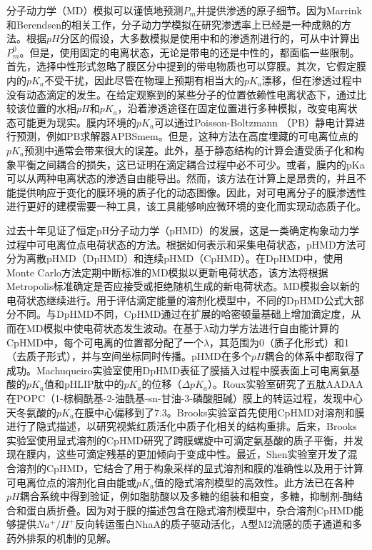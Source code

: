 \documentclass[journal=,manuscript=artical,email=false]{achemso}
\begin{document}
分子动力学（MD）模拟可以谨慎地预测$P_m$并提供渗透的原子细节。因为Marrink和Berendsen的相关工作，分子动力学模拟在研究渗透率上已经是一种成熟的方法。根据$pH$分区的假设，大多数模拟是使用中和的渗透剂进行的，可从中计算出$P^0_m$。但是，使用固定的电离状态，无论是带电的还是中性的，都面临一些限制。首先，选择中性形式忽略了膜区分中提到的带电物质也可以穿膜。其次，它假定膜内的$pK_a$不受干扰，因此尽管在物理上预期有相当大的$pK_a$漂移，但在渗透过程中没有动态滴定的发生。在给定观察到的某些分子的位置依赖性电离状态下，通过比较该位置的水相$pH$和$pK_a$，沿着渗透途径在固定位置进行多种模拟，改变电离状态可能更为现实。膜内环境的$pK_a$可以通过Poisson-Boltzmann （PB）静电计算进行预测，例如PB求解器APBSmem。但是，这种方法在高度埋藏的可电离位点的$pK_a$预测中通常会带来很大的误差。此外，基于静态结构的计算会遭受质子化和构象平衡之间耦合的损失，这已证明在滴定耦合过程中必不可少。或者，膜内的pKa可以从两种电离状态的渗透自由能导出。然而，该方法在计算上是昂贵的，并且不能提供响应于变化的膜环境的质子化的动态图像。因此，对可电离分子的膜渗透性进行更好的建模需要一种工具，该工具能够响应微环境的变化而实现动态质子化。

过去十年见证了恒定pH分子动力学（pHMD）的发展，这是一类确定构象动力学过程中可电离位点电荷状态的方法。根据如何表示和采集电荷状态，pHMD方法可分为离散pHMD（DpHMD）和连续pHMD（CpHMD）。在DpHMD中，使用Monte Carlo方法定期中断标准的MD模拟以更新电荷状态，该方法将根据Metropolis标准确定是否应接受或拒绝随机生成的新电荷状态。MD模拟会以新的电荷状态继续进行。用于评估滴定能量的溶剂化模型中，不同的DpHMD公式大部分不同。与DpHMD不同，CpHMD通过在扩展的哈密顿量基础上增加滴定度，从而在MD模拟中使电荷状态发生波动。在基于$\lambda$动力学方法进行自由能计算的CpHMD中，每个可电离的位置都分配了一个$\lambda$，其范围为0（质子化形式）和1（去质子形式），并与空间坐标同时传播。pHMD在多个$pH$耦合的体系中都取得了成功。Machuqueiro实验室使用DpHMD表征了膜插入过程中膜表面上可电离氨基酸的$pK_a$值和pHLIP肽中的$pK_a$的位移（$\Delta pK_a$）。Roux实验室研究了五肽AADAA在PO​​PC（1-棕榈酰基-2-油酰基-sn-甘油-3-磷酸胆碱）膜上的转运过程，发现中心天冬氨酸的$pK_a$在膜中心偏移到了$7.3$。Brooks实验室首先使用CpHMD对溶剂和膜进行了隐式描述，以研究视紫红质活化中质子化相关的结构重排。后来，Brooks实验室使用显式溶剂的CpHMD研究了跨膜螺旋中可滴定氨基酸的质子平衡，并发现在膜内，这些可滴定残基的更加倾向于变成中性。最近，Shen实验室开发了混合溶剂的CpHMD，它结合了用于构象采样的显式溶剂和膜的准确性以及用于计算可电离位点的溶剂化自由能或$pK_a$值的隐式溶剂模型的高效性。此方法已在各种$pH$耦合系统中得到验证，例如脂肪酸以及多糖的组装和相变，多糖，抑制剂-酶结合和蛋白质折叠。因为对于膜的描述包含在隐式溶剂模型中，杂合溶剂CpHMD能够提供$Na^{+} / H^{+}$反向转运蛋白NhaA的质子驱动活化，A型M2流感的质子通道和多药外排泵的机制的见解。
\end{document}
